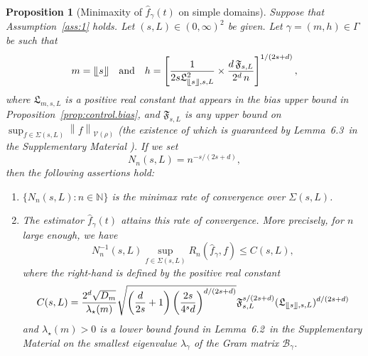 \documentclass[bj,authoryear]{imsart}
\numberwithin{equation}{section}
\theoremstyle{plain}
\newtheorem{proposition}[theorem]{Proposition}
\theoremstyle{remark}
\newcommand{\N}{\mathbb{N}}
\newcommand{\1}{\mathds{1}}
\newcommand{\voisin}{\mathcal{V}}
\newcommand{\pwrisk}{R_n}
\newcommand{\finfty}{\left\|f\right\|_{\voisin(\rho)}}
\newcommand{\lemusualbehavior}{6.2~}
\newcommand{\leminftynormf}{6.3~}
\begin{document}
    \begin{proposition}[Minimaxity of $\hat{f}_{\gamma}(t)$ on simple domains]\label{prop:minimaxity.simple.domains}
        Suppose that Assumption~\ref{ass:1} holds.
        Let $(s,L)\in (0,\infty)^2$ be given.
        Let $\gamma = (m,h)\in \Gamma$ be such that
        \begin{equation}\label{eq:def-gamma-minimax-usual}
            m = \llfloor s \rrfloor
            \quad \text{and} \quad
            h = \left[\frac{1}{2s \mathfrak{L}_{\llfloor s \rrfloor,s,L}^2} \times \frac{d \, \mathfrak{F}_{s,L}}{2^d \, n}\right]^{1/(2s+d)},
        \end{equation}
        where $\mathfrak{L}_{m,s,L}$ is a positive real constant that appears in the bias upper bound in Proposition~\ref{prop:control.bias}, and $\mathfrak{F}_{s,L}$ is any upper bound on $\sup_{f\in \Sigma(s,L)} \finfty$ (the existence of which is guaranteed by Lemma~\leminftynormf in the Supplementary Material \citep{BertinKlutchnikoffOuimet2024supplement}).
        If we set
        \begin{equation}\label{eq:N.n}
            N_n(s,L) =  n^{-s/(2s+d)},
        \end{equation}
        then the following assertions hold:
        \begin{enumerate}
            \item $\{N_n(s,L) : n\in \N\}$ is the minimax rate of convergence over $\Sigma(s,L)$.
            \item The estimator $\hat{f}_{\gamma}(t)$ attains this rate of convergence. More precisely, for $n$ large enough, we have
            \begin{equation*}
                N_n^{-1}(s,L)\sup_{f\in \Sigma(s,L)}
                \pwrisk(\hat{f}_{\gamma}, f)
                \leq
                C(s,L),
            \end{equation*}
            where the right-hand is defined by the positive real constant
            \begin{equation}\label{eq:C.s.L}
                C(s,L) = \frac{2^d \sqrt{D_m}}{\lambda_{\star}(m)} \sqrt{\left(\frac{d}{2s} + 1\right) \left(\frac{2s}{4^s d}\right)^{d/(2s+d)}} \mathfrak{F}_{s,L}^{s/(2s+d)} (\mathfrak{L}_{\llfloor s \rrfloor,s,L})^{d/(2s+d)}
            \end{equation}
            and $\lambda_{\star}(m) > 0$ is a lower bound found in Lemma~\lemusualbehavior in the Supplementary Material \citep{BertinKlutchnikoffOuimet2024supplement} on the smallest eigenvalue $\lambda_{\gamma}$ of the Gram matrix $\mathcal{B}_{\gamma}$.
        \end{enumerate}
    \end{proposition}
\end{document}
